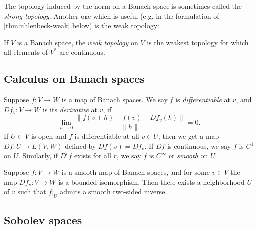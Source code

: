 \documentclass[12pt,letterpaper,reqno]{article}
\numberwithin{equation}{section}
\newcommand{\norm}[1]{\lVert#1\rVert}
\newcommand{\ti}[1]{\textit{#1}}
\begin{document}
The topology induced by the norm on a Banach space is sometimes
called the \ti{strong topology}.
Another one which is useful (e.g. in the formulation of \autoref{thm:uhlenbeck-weak}
below) is the weak topology:
\begin{defn}
If $V$ is a Banach space, the \ti{weak topology} on $V$
is the weakest topology for which all elements of $V^*$
are continuous.
\end{defn}



\subsection{Calculus on Banach spaces}

\begin{defn}
Suppose $f: V \to W$ is a map of Banach spaces.
We say $f$ is \ti{differentiable} at $v$, and $D f_v: V \to W$ is its
\ti{derivative} at $v$, if
\begin{equation}
  \lim_{h \to 0} \frac{\norm{f(v+h) - f(v) - D f_v(h)}}{\norm{h}} = 0.
\end{equation}
If $U \subset V$ is open and $f$ is differentiable at all $v \in U$,
then we get a map $D f: U \to L(V,W)$ defined by $D f(v) = D f_v$.
If $D f$ is continuous, we say $f$ is $C^1$ on $U$.
Similarly, if $D^r f$ exists for all $r$, we say $f$
is $C^\infty$ or \ti{smooth} on $U$.
\end{defn}

\begin{thm}
Suppose $f: V \to W$ is a smooth map of Banach spaces, and for some
$v \in V$ the map $D f_v: V \to W$ is a bounded isomorphism.
Then there exists a neighborhood $U$ of $v$ such that $f \vert_U$
admits a smooth two-sided inverse.
\end{thm}


\subsection{Sobolev spaces}
\end{document}
